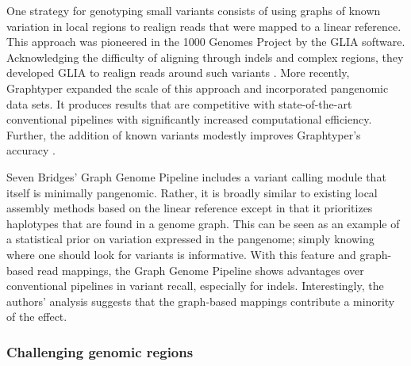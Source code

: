 One strategy for genotyping small variants consists of using graphs of known variation in local regions to realign reads that were mapped to a linear reference.
This approach was pioneered in the 1000 Genomes Project by the GLIA software.
Acknowledging the difficulty of aligning through indels and complex regions, they developed GLIA to realign reads around such variants \cite{1000_2015}.
More recently, Graphtyper expanded the scale of this approach and incorporated pangenomic data sets.
It produces results that are competitive with state-of-the-art conventional pipelines with significantly increased computational efficiency.
Further, the addition of known variants modestly improves Graphtyper's accuracy \cite{eggertsson2017graphtyper}.

Seven Bridges' Graph Genome Pipeline includes a variant calling module that itself is minimally pangenomic.
Rather, it is broadly similar to existing local assembly methods based on the linear reference except in that it prioritizes haplotypes that are found in a genome graph.
This can be seen as an example of a statistical prior on variation expressed in the pangenome; simply knowing where one should look for variants is informative.
With this feature and graph-based read mappings, the Graph Genome Pipeline shows advantages over conventional pipelines in variant recall, especially for indels.
Interestingly, the authors' analysis suggests that the graph-based mappings contribute a minority of the effect.

%

\subsubsection{Challenging genomic regions}

